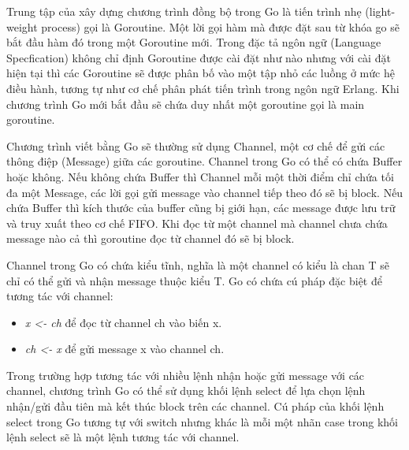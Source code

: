 Trung tập của xây dựng chương trình đồng bộ trong Go là tiến trình
nhẹ (light-weight process) gọi là Goroutine. Một lời gọi hàm mà
được đặt sau từ khóa go sẽ bắt đầu hàm đó trong một Goroutine mới.
Trong đặc tả ngôn ngữ (Language Specfication) không chỉ định Goroutine
được cài đặt như nào nhưng với cài đặt hiện tại thì các Goroutine
sẽ được phân bố vào một tập nhỏ các luồng ở mức hệ điều hành,
tương tự như cơ chế phân phát tiến trình trong ngôn ngữ Erlang.
Khi chương trình Go mới bắt đầu sẽ chứa duy nhất
một goroutine gọi là main goroutine.

Chương trình viết bằng Go sẽ thường sử dụng Channel, một cơ chế để
gửi các thông điệp (Message) giữa các goroutine. Channel trong Go có thể
có chứa Buffer hoặc không. Nếu không chứa Buffer thì Channel mỗi một
thời điểm chỉ chứa tối đa một Message, các lời gọi gửi message vào
channel tiếp theo đó sẽ bị block. Nếu chứa Buffer thì kích thước
của buffer cũng bị giới hạn, các message được lưu trữ và truy xuất theo
cơ chế FIFO. Khi đọc từ một channel mà channel chưa chứa message nào
cả thì goroutine đọc từ channel đó sẽ bị block. 

Channel trong Go có chứa kiểu tĩnh, nghĩa là một channel có kiểu
là chan T sẽ chỉ có thể gửi và nhận message thuộc kiểu T.
Go có chứa cú pháp đặc biệt để tương tác với channel:
\begin{itemize}[topsep=0ex]
\item \textit{x <- ch} để đọc từ channel ch vào biến x.
\item \textit{ch <- x} để gửi message x vào channel ch.
\end{itemize}
Trong trường hợp tương tác với nhiều lệnh nhận hoặc gửi message với các
channel, chương trình Go có thể sử dụng khối lệnh select để lựa chọn
lệnh nhận/gửi đầu tiên mà kết thúc block trên các channel. Cú pháp
của khối lệnh select trong Go tương tự với switch nhưng khác
là mỗi một nhãn case trong khối lệnh select sẽ là một
lệnh tương tác với channel.

